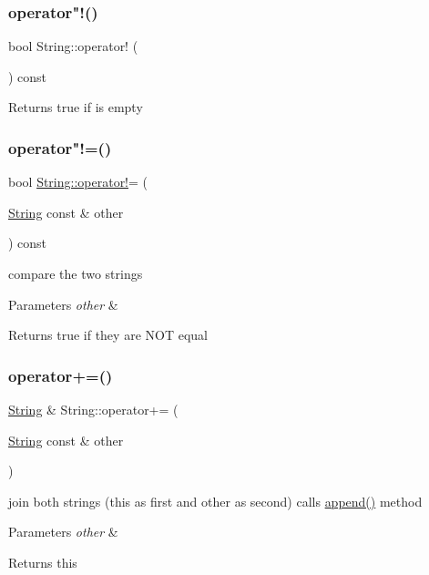 \subsubsection{\texorpdfstring{operator"!()}{operator!()}}
{\footnotesize\ttfamily bool String\+::operator! (\begin{DoxyParamCaption}{ }\end{DoxyParamCaption}) const}

\begin{DoxyReturn}{Returns}
true if is empty 
\end{DoxyReturn}
\mbox{\label{classString_abfb25af8317420d71b0d54603d049383}} 
\subsubsection{\texorpdfstring{operator"!=()}{operator!=()}}
{\footnotesize\ttfamily bool \hyperlink{classString_a3a8304a7fe06a23f1750629a9186d346}{String\+::operator!}= (\begin{DoxyParamCaption}\item[{\hyperlink{classString}{String} const \&}]{other }\end{DoxyParamCaption}) const}

compare the two strings 
\begin{DoxyParams}{Parameters}
{\em other} & \\
\hline
\end{DoxyParams}
\begin{DoxyReturn}{Returns}
true if they are N\+OT equal 
\end{DoxyReturn}
\mbox{\label{classString_acdfa6ad1771ff7c9f9a9dacc177e6661}} 
\subsubsection{\texorpdfstring{operator+=()}{operator+=()}}
{\footnotesize\ttfamily \hyperlink{classString}{String} \& String\+::operator+= (\begin{DoxyParamCaption}\item[{\hyperlink{classString}{String} const \&}]{other }\end{DoxyParamCaption})}

join both strings (this as first and other as second) calls \hyperlink{classString_a8a191fafb7af689d86f50423e97e60d7}{append()} method 
\begin{DoxyParams}{Parameters}
{\em other} & \\
\hline
\end{DoxyParams}
\begin{DoxyReturn}{Returns}
this 
\end{DoxyReturn}
\mbox{\label{classString_a223bf46daeb4d9b4a7000feea4d7a6b3}} 
